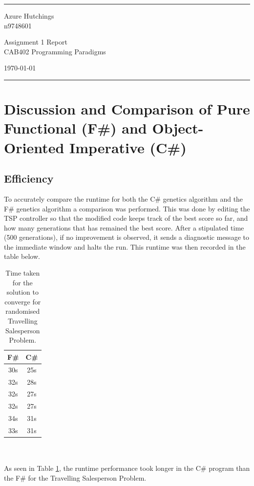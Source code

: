 \documentclass[a4paper]{article}
\begin{document}

\fancyhead[C]{}
\hrule \medskip %
\begin{minipage}{0.295\textwidth} 
\raggedright
\footnotesize
Azure Hutchings \hfill\\   
n9748601 \hfill\\
\end{minipage}
\begin{minipage}{0.4\textwidth} 
\centering 
\large 
Assignment 1 Report\\ 
\normalsize 
CAB402 Programming Paradigms\\ 
\end{minipage}
\begin{minipage}{0.295\textwidth} 
\raggedleft
\today\hfill\\
\end{minipage}
\medskip\hrule 
\bigskip

\section*{Discussion and Comparison of Pure Functional (F\#) and Object-Oriented Imperative (C\#)}

\subsection*{Efficiency}
To accurately compare the runtime for both the C\# genetics algorithm and the F\# genetics algorithm a comparison was performed. This was done by editing the TSP controller so that the modified code keeps track of the best score so far, and how many generations that has remained the best score. After a stipulated time (500 generations), if no improvement is observed, it sends a diagnostic message to the immediate window and halts the run. This runtime was then recorded in the table below.
\begin{table}[h!]
\centering
 \begin{tabular}{||c c ||} 
 \hline
 F\# & C\# \\ [0.5ex] 
 \hline\hline
 30s & 25s  \\ 
 \hline
 32s & 28s \\
 \hline
 32s & 27s \\
 \hline
 32s & 27s \\
 \hline
 34s & 31s \\
 \hline
 33s & 31s\\[0.5ex]
 \hline
\end{tabular}
\caption{Time taken for the solution to converge for randomised Travelling Salesperson Problem.} \label{tab:efficency}
\end{table}
\\\\
As seen in Table \ref{tab:efficency}, the runtime performance took longer in the C\# program than the F\# for the Travelling Salesperson Problem. 
\end{document}

